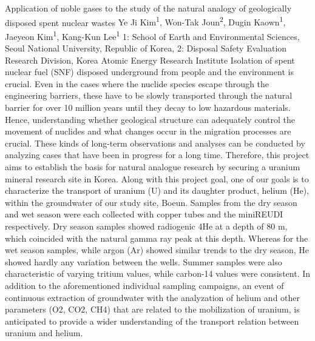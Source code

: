 \begin{conf-abstract}
{Application of noble gases to the study of the natural analogy of geologically disposed spent nuclear wastes}
{Ye Ji Kim\textsuperscript{1}, Won-Tak Joun\textsuperscript{2}, Dugin Kaown\textsuperscript{1}, Jaeyeon Kim\textsuperscript{1}, Kang-Kun Lee\textsuperscript{1}}
{1: School of Earth and Environmental Sciences, Seoul National University, Republic of Korea, 2: Disposal Safety Evaluation Research Division, Korea Atomic Energy Research Institute}
{Isolation of spent nuclear fuel (SNF) disposed underground from people and the environment is crucial. Even in the cases where the nuclide species escape through the engineering barriers, these have to be slowly transported through the natural barrier for over 10 million years until they decay to low hazardous materials. Hence, understanding whether geological structure can adequately control the movement of nuclides and what changes occur in the migration processes are crucial. These kinds of long-term observations and analyses can be conducted by analyzing cases that have been in progress for a long time. Therefore, this project aims to establish the basis for natural analogue research by securing a uranium mineral research site in Korea. Along with this project goal, one of our goals is to characterize the transport of uranium (U) and its daughter product, helium (He), within the groundwater of our study site, Boeun. Samples from the dry season and wet season were each collected with copper tubes and the miniREUDI respectively. Dry season samples showed radiogenic 4He at a depth of 80 m, which coincided with the natural gamma ray peak at this depth. Whereas for the wet season samples, while argon (Ar) showed similar trends to the dry season, He showed hardly any variation between the wells. Summer samples were also characteristic of varying tritium values, while carbon-14 values were consistent. In addition to the aforementioned individual sampling campaigns, an event of continuous extraction of groundwater with the analyzation of helium and other parameters (O2, CO2, CH4) that are related to the mobilization of uranium, is anticipated to provide a wider understanding of the transport relation between uranium and helium.}
\end{conf-abstract}




